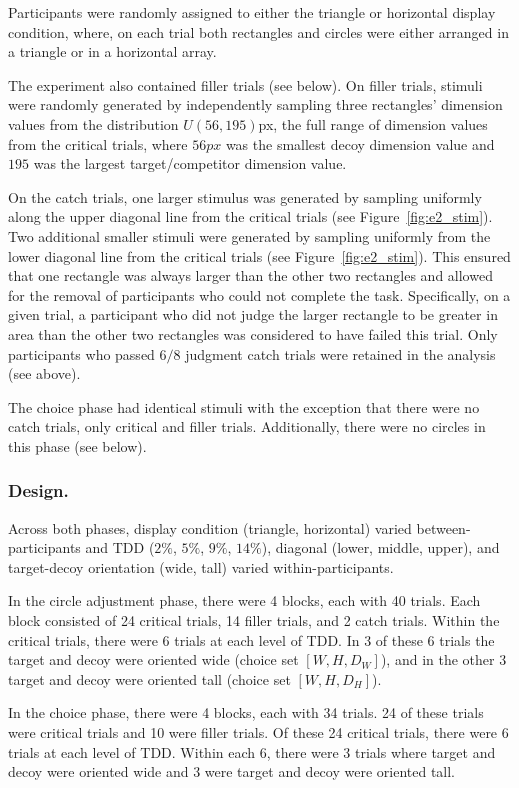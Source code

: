 Participants were randomly assigned to either the triangle or horizontal display condition, where, on each trial both rectangles and circles were either arranged in a triangle or in a horizontal array.

The experiment also contained filler trials (see below). On filler trials, stimuli were randomly generated by independently sampling three rectangles' dimension values from the distribution $U(56,195)$px, the full range of dimension values from the critical trials, where $56px$ was the smallest decoy dimension value and $195$ was the largest target/competitor dimension value.

On the catch trials, one larger stimulus was generated by sampling uniformly along the upper diagonal line from the critical trials (see Figure~\ref{fig:e2_stim}). Two additional smaller stimuli were generated by sampling uniformly from the lower diagonal line from the critical trials (see Figure~\ref{fig:e2_stim}). This ensured that one rectangle was always larger than the other two rectangles and allowed for the removal of participants who could not complete the task. Specifically, on a given trial, a participant who did not judge the larger rectangle to be greater in area than the other two rectangles was considered to have failed this trial. Only participants who passed $6/8$ judgment catch trials were retained in the analysis (see above).

The choice phase had identical stimuli with the exception that there were no catch trials, only critical and filler trials. Additionally, there were no circles in this phase (see below). 

\subsubsection{Design.}
Across both phases, display condition (triangle, horizontal) varied between-participants and TDD ($2\%$, $5\%$, $9\%$, $14\%$), diagonal (lower, middle, upper), and target-decoy orientation (wide, tall) varied within-participants. 

In the circle adjustment phase, there were 4 blocks, each with 40 trials. Each block consisted of 24 critical trials, 14 filler trials, and 2 catch trials. Within the critical trials, there were 6 trials at each level of TDD. In 3 of these 6 trials the target and decoy were oriented wide (choice set $[W,H,D_{W}]$), and in the other 3 target and decoy were oriented tall (choice set $[W,H,D_{H}]$). 

In the choice phase, there were 4 blocks, each with 34 trials. 24 of these trials were critical trials and 10 were filler trials. Of these 24 critical trials, there were 6 trials at each level of TDD. Within each 6, there were 3 trials where target and decoy were oriented wide and 3 were target and decoy were oriented tall. 


